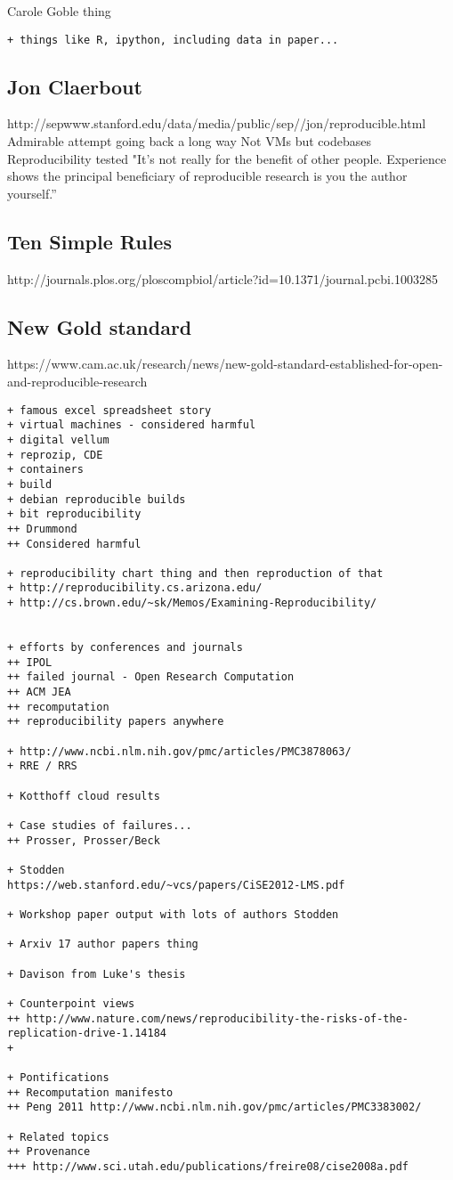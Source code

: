 \documentclass[11pt]{article}
\begin{document}
Carole Goble thing

\begin{verbatim}
+ things like R, ipython, including data in paper... 
\end{verbatim}


\subsection{Jon Claerbout}

http://sepwww.stanford.edu/data/media/public/sep//jon/reproducible.html
Admirable attempt going back a long way
Not VMs but codebases
Reproducibility tested 
"It's not really for the benefit of other people. Experience shows the principal beneficiary of reproducible research is you the author yourself.”

\subsection{Ten Simple Rules}
http://journals.plos.org/ploscompbiol/article?id=10.1371/journal.pcbi.1003285

\subsection{New Gold standard}
https://www.cam.ac.uk/research/news/new-gold-standard-established-for-open-and-reproducible-research

\begin{verbatim}
+ famous excel spreadsheet story
+ virtual machines - considered harmful 
+ digital vellum
+ reprozip, CDE
+ containers
+ build 
+ debian reproducible builds
+ bit reproducibility
++ Drummond
++ Considered harmful

+ reproducibility chart thing and then reproduction of that
+ http://reproducibility.cs.arizona.edu/
+ http://cs.brown.edu/~sk/Memos/Examining-Reproducibility/


+ efforts by conferences and journals 
++ IPOL
++ failed journal - Open Research Computation
++ ACM JEA
++ recomputation
++ reproducibility papers anywhere

+ http://www.ncbi.nlm.nih.gov/pmc/articles/PMC3878063/
+ RRE / RRS 

+ Kotthoff cloud results

+ Case studies of failures...
++ Prosser, Prosser/Beck

+ Stodden 
https://web.stanford.edu/~vcs/papers/CiSE2012-LMS.pdf

+ Workshop paper output with lots of authors Stodden 

+ Arxiv 17 author papers thing 

+ Davison from Luke's thesis

+ Counterpoint views
++ http://www.nature.com/news/reproducibility-the-risks-of-the-replication-drive-1.14184
+ 

+ Pontifications
++ Recomputation manifesto
++ Peng 2011 http://www.ncbi.nlm.nih.gov/pmc/articles/PMC3383002/

+ Related topics
++ Provenance 
+++ http://www.sci.utah.edu/publications/freire08/cise2008a.pdf


\end{verbatim}
\end{document}
